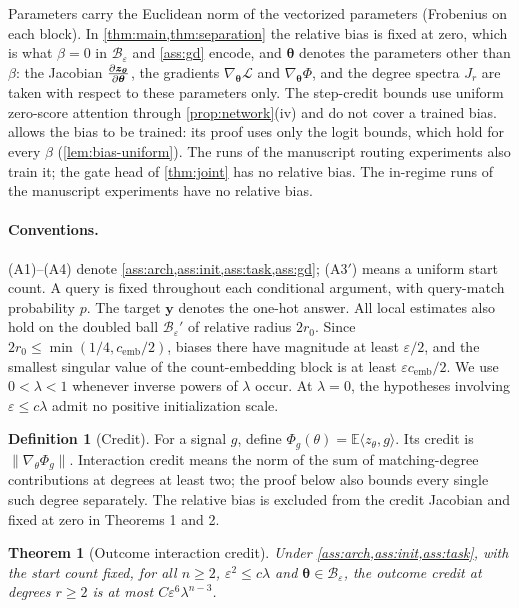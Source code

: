 \documentclass[11pt]{article}
\newtheorem{theorem}{Theorem}
\theoremstyle{definition}
\newtheorem{definition}{Definition}
\theoremstyle{remark}
\newcommand{\cred}{\Phi}
\newcommand{\initscale}{\varepsilon}
\newcommand{\mixrate}{\lambda}
\newcommand{\initball}{\mathcal B_{\initscale}}
\newcommand{\Jz}{\mathchoice{\frac{\partial\bm z_{\bm\theta}}{\partial\bm\theta}}{\tfrac{\partial\bm z_{\bm\theta}}{\partial\bm\theta}}{\partial\bm z_{\bm\theta}/\partial\bm\theta}{\partial\bm z_{\bm\theta}/\partial\bm\theta}}
\begin{document}
\label{rem:norms}Parameters carry the Euclidean norm of the vectorized parameters (Frobenius on
each block). In \cref{thm:main,thm:separation} the relative bias is fixed at zero, which is what $\beta=0$ in $\initball$ and
\cref{ass:gd} encode, and $\bm\theta$ denotes the parameters other than $\beta$: the Jacobian $\Jz$, the gradients $\nabla_{\bm\theta}\mathcal L$ and
$\nabla_{\bm\theta}\cred$, and the degree spectra $J_r$ are taken with respect to these parameters only. The step-credit bounds use uniform
zero-score attention through \cref{prop:network}(iv) and do not cover a trained bias.  allows the bias to be
trained: its proof uses only the logit bounds, which hold for every $\beta$ (\cref{lem:bias-uniform}). The runs of the manuscript routing experiments also train it; the gate head of \cref{thm:joint} has no relative bias. The in-regime runs of the manuscript experiments have no relative bias.



\paragraph{Conventions.} (A1)--(A4) denote \cref{ass:arch,ass:init,ass:task,ass:gd}; (A3$'$) means a uniform start count. A query is fixed throughout each conditional argument, with query-match probability $p$. The target $\bm y$ denotes the one-hot answer. All local estimates also hold on the doubled ball $\initball'$ of relative radius $2r_0$. Since $2r_0\le\min(1/4,c_{\mathrm{emb}}/2)$, biases there have magnitude at least $\varepsilon/2$, and the smallest singular value of the count-embedding block is at least $\varepsilon c_{\mathrm{emb}}/2$. We use $0<\lambda<1$ whenever inverse powers of $\lambda$ occur. At $\lambda=0$, the hypotheses involving $\varepsilon\le c\lambda$ admit no positive initialization scale.

\begin{definition}[Credit]\label{def:credit}
For a signal $g$, define $\cred_g(\theta)=\mathbb E\langle z_\theta,g\rangle$. Its credit is $\|\nabla_\theta\cred_g\|$. Interaction credit means the norm of the sum of matching-degree contributions at degrees at least two; the proof below also bounds every single such degree separately. The relative bias is excluded from the credit Jacobian and fixed at zero in Theorems 1 and 2.
\end{definition}
\begin{theorem}[Outcome interaction credit]
\label{thm:main}
Under \cref{ass:arch,ass:init,ass:task}, with the start count fixed, for all $n\ge2$, $\initscale^2\le c\mixrate$ and
$\bm\theta\in\initball$, the outcome credit at degrees $r\ge2$ is at most $C\initscale^6\mixrate^{n-3}$.
\end{theorem}
\end{document}
